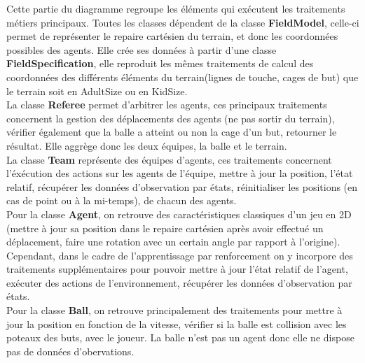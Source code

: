\documentclass[11pt, a4paper]{article}
\begin{document}
	Cette partie du diagramme regroupe les éléments qui exécutent les traitements métiers principaux. Toutes les classes dépendent
	de la classe \textbf{FieldModel}, celle-ci permet de représenter le repaire cartésien du terrain, et donc les coordonnées possibles des agents.
	Elle crée ses données à partir d'une classe \textbf{FieldSpecification}, elle reproduit les mêmes traitements de calcul des coordonnées des différents éléments du terrain(lignes de touche, cages de but) que le terrain soit en AdultSize ou en KidSize. \\
	La classe \textbf{Referee} permet d'arbitrer les agents, ces principaux traitements concernent la gestion des déplacements des agents (ne pas sortir du terrain), vérifier également que la balle a atteint ou non la cage d'un but, retourner le résultat. Elle aggrège donc les deux équipes, la balle et le terrain. \\
	La classe \textbf{Team} représente des équipes d'agents, ces traitements concernent l'éxécution des actions sur les agents de l'équipe, mettre à jour
	la position, l'état relatif, récupérer les données d'observation par états, réinitialiser les positions (en cas de point ou à la mi-temps), de chacun des agents. \\
	Pour la classe \textbf{Agent}, on retrouve des caractéristiques classiques d'un jeu en 2D (mettre à jour sa position dans le repaire cartésien après avoir effectué un déplacement, faire une rotation avec un certain angle par rapport à l'origine). Cependant, dans le cadre
	de l'apprentissage par renforcement on y incorpore des traitements supplémentaires pour pouvoir mettre à jour l'état relatif de l'agent, exécuter des actions de l'environnement, récupérer les données d'observation par états.\\
	Pour la classe \textbf{Ball}, on retrouve principalement des traitements pour mettre à jour la position en fonction de la vitesse, vérifier
	si la balle est collision avec les poteaux des buts, avec le joueur. La balle n'est pas un agent donc elle ne dispose pas de données d'obervations.\\
\end{document}
